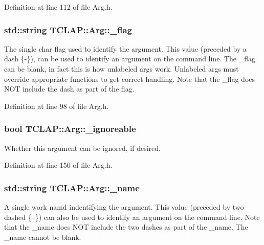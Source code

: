 Definition at line 112 of file Arg.\+h.

\hypertarget{class_t_c_l_a_p_1_1_arg_ae68407a0a8223023ad0ae3b9dc7986f5}{}
\subsubsection[{\+\_\+flag}]{\setlength{\rightskip}{0pt plus 5cm}std\+::string T\+C\+L\+A\+P\+::\+Arg\+::\+\_\+flag\hspace{0.3cm}{\ttfamily [protected]}}\label{class_t_c_l_a_p_1_1_arg_ae68407a0a8223023ad0ae3b9dc7986f5}
The single char flag used to identify the argument. This value (preceded by a dash \{-\/\}), can be used to identify an argument on the command line. The \+\_\+flag can be blank, in fact this is how unlabeled args work. Unlabeled args must override appropriate functions to get correct handling. Note that the \+\_\+flag does N\+O\+T include the dash as part of the flag. 

Definition at line 98 of file Arg.\+h.

\hypertarget{class_t_c_l_a_p_1_1_arg_a9832bb7564f4ab472bd51b7b1bbc683f}{}
\subsubsection[{\+\_\+ignoreable}]{\setlength{\rightskip}{0pt plus 5cm}bool T\+C\+L\+A\+P\+::\+Arg\+::\+\_\+ignoreable\hspace{0.3cm}{\ttfamily [protected]}}\label{class_t_c_l_a_p_1_1_arg_a9832bb7564f4ab472bd51b7b1bbc683f}
Whether this argument can be ignored, if desired. 

Definition at line 150 of file Arg.\+h.

\hypertarget{class_t_c_l_a_p_1_1_arg_ac0f138057a99fb5d94ff4acb41a083aa}{}
\subsubsection[{\+\_\+name}]{\setlength{\rightskip}{0pt plus 5cm}std\+::string T\+C\+L\+A\+P\+::\+Arg\+::\+\_\+name\hspace{0.3cm}{\ttfamily [protected]}}\label{class_t_c_l_a_p_1_1_arg_ac0f138057a99fb5d94ff4acb41a083aa}
A single work namd indentifying the argument. This value (preceded by two dashed \{--\}) can also be used to identify an argument on the command line. Note that the \+\_\+name does N\+O\+T include the two dashes as part of the \+\_\+name. The \+\_\+name cannot be blank. 

